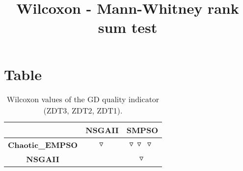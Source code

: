\documentclass{article}
\title{Wilcoxon - Mann-Whitney rank sum test}
\author{}
\begin{document}
\maketitle
\section{Table}
\begin{table}[!htp]
  \caption{Wilcoxon values of the GD quality indicator (ZDT3, ZDT2, ZDT1).}
  \label{table:GD}
  \centering
  \begin{scriptsize}
  \begin{tabular}{c|cc}
      & \textbf{NSGAII} & \textbf{SMPSO} \\\hline
      \textbf{Chaotic_EMPSO} & $\triangledown\  $ & $ \triangledown\ \triangledown\ \triangledown\ $ \\
      \textbf{NSGAII} & $ $ & $ \triangledown\ $ \\
  \end{tabular}
  \end{scriptsize}
\end{table}
\end{document}
